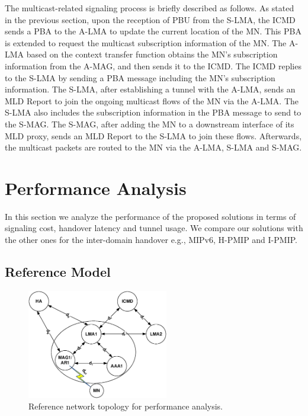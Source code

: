 The multicast-related signaling process is briefly described as follows. As stated in the previous section, upon the reception of PBU from the S-LMA, the ICMD sends a PBA to the A-LMA to update the current location of the MN. This PBA is extended to request the multicast subscription information of the MN. The A-LMA based on the context transfer function obtains the MN's subscription information from the A-MAG, and then sends it to the ICMD. The ICMD replies to the S-LMA by sending a PBA message including the MN's subscription information. The S-LMA, after establishing a tunnel with the A-LMA, sends an MLD Report to join the ongoing multicast flows of the MN via the A-LMA. The S-LMA also includes the subscription information in the PBA message to send to the S-MAG. The S-MAG, after adding the MN to a downstream interface of its MLD proxy, sends an MLD Report to the S-LMA to join these flows. Afterwards, the multicast packets are routed to the MN via the A-LMA, S-LMA and S-MAG.
\section{Performance Analysis}\label{ch9:performance_analysis}
In this section we analyze the performance of the proposed solutions in terms of signaling cost, handover latency and tunnel usage. We compare our solutions with the other ones for the inter-domain handover e.g., MIPv6, H-PMIP and I-PMIP. 
\subsection{Reference Model}
\begin{figure}[h!]
\centering
\includegraphics[width=0.55\textwidth]{./Part3/Chapter7/figures/c9_topology_analysis.eps}
\caption[Reference network topology for performance analysis.]{Reference network topology for performance analysis.}
\label{fig:c9_reference}
\end{figure}

